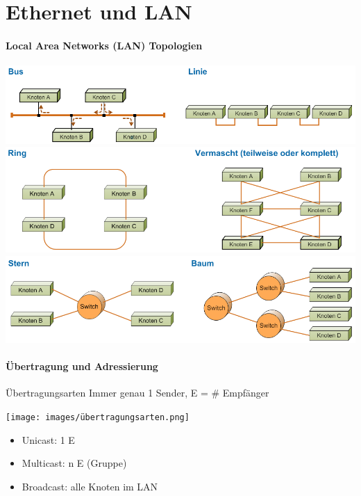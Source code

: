 \section{Ethernet und LAN}
\paragraph{Local Area Networks (LAN) Topologien}

    \centering
    \includegraphics[width=0.85\linewidth]{images/bus_linie_topo.png}\\
    \includegraphics[width=0.85\linewidth]{images/ring_vermascht_topo.png}\\
    \includegraphics[width=0.85\linewidth]{images/stern_baum_topo.png}

\paragraph{Übertragung und Adressierung}

\begin{definition}{Übertragungsarten}
    Immer genau 1 Sender, E = \# Empfänger
    
    \begin{minipage}{0.35\linewidth}
        \texttt{[image: images/übertragungsarten.png]}
    \end{minipage}
    \begin{minipage}{0.6\linewidth}
        \begin{itemize}
            \item Unicast: 1 E 
            \item Multicast: n E (Gruppe)
            \item Broadcast: alle Knoten im LAN
        \end{itemize}
    \end{minipage}
\end{definition}


